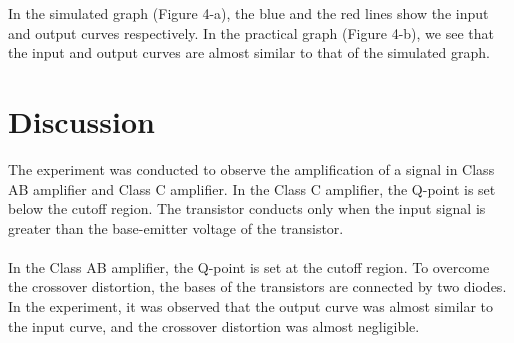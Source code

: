 \documentclass[12pt]{article}
\begin{document}
In the simulated graph (Figure 4-a), the blue and the red lines show the input and output curves respectively. In the practical graph (Figure 4-b), we see that the input and output curves are almost similar to that of the simulated graph.

\FloatBarrier
\section{Discussion}
The experiment was conducted to observe the amplification of a signal in Class AB amplifier and Class C amplifier. In the Class C amplifier, the Q-point is set below the cutoff region. The transistor conducts only when the input signal is greater than the base-emitter voltage of the transistor. \\~\\

In the Class AB amplifier, the Q-point is set at the cutoff region. To overcome the crossover distortion, the bases of the transistors are connected by two diodes. In the experiment, it was observed that the output curve was almost similar to the input curve, and the crossover distortion was almost negligible.
\end{document}
